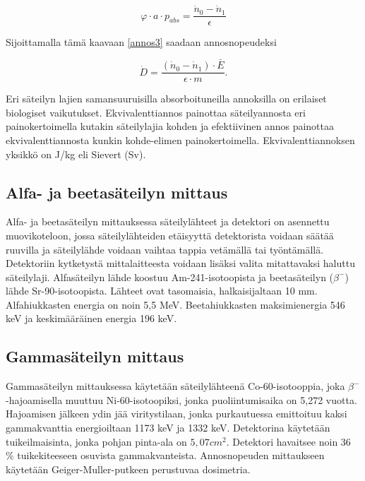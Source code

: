 \documentclass[a4paper,11pt]{article}
\begin{document}
\begin{equation}
  \varphi \cdot a \cdot p_{abs} = \frac{\dot{n}_0-\dot{n}_1}{\epsilon}
\end{equation}

Sijoittamalla tämä kaavaan \ref{annos3} saadaan annosnopeudeksi

\begin{equation}
  \dot{D} = \frac{(\dot{n}_0-\dot{n}_1) \cdot \bar{E}}{\epsilon \cdot m} .
\end{equation}

Eri säteilyn lajien samansuuruisilla absorboituneilla annoksilla on erilaiset biologiset vaikutukset. Ekvivalenttiannos painottaa säteilyannosta eri painokertoimella kutakin säteilylajia kohden ja efektiivinen annos painottaa ekvivalenttiannosta kunkin kohde-elimen painokertoimella. Ekvivalenttiannoksen yksikkö on J/kg eli Sievert (Sv).

\cite{ohje}

\subsection{Alfa- ja beetasäteilyn mittaus}
\label{laitteisto:alfabeeta}

Alfa- ja beetasäteilyn mittauksessa säteilylähteet ja detektori on asennettu muovikoteloon, jossa säteilylähteiden etäisyyttä detektorista voidaan säätää ruuvilla ja säteilylähde voidaan vaihtaa tappia vetämällä tai työntämällä. Detektoriin kytketystä mittalaitteesta voidaan lisäksi valita mitattavaksi haluttu säteilylaji. Alfasäteilyn lähde koostuu Am-241-isotoopista ja beetasäteilyn ($\beta^-$) lähde Sr-90-isotoopista. Lähteet ovat tasomaisia, halkaisijaltaan 10 mm. Alfahiukkasten energia on noin 5,5 MeV. Beetahiukkasten maksimienergia 546 keV ja keskimääräinen energia 196 keV. \cite{ohje}


\subsection{Gammasäteilyn mittaus}
\label{laitteisto:gamma}

Gammasäteilyn mittauksessa käytetään säteilylähteenä Co-60-isotooppia, joka $\beta^-$-hajoamisella muuttuu Ni-60-isotoopiksi, jonka puoliintumisaika on 5,272 vuotta. Hajoamisen jälkeen ydin jää viritystilaan, jonka purkautuessa emittoituu kaksi gammakvanttia energioiltaan 1173 keV ja 1332 keV. Detektorina käytetään tuikeilmaisinta, jonka pohjan pinta-ala on $5,07 cm^2$. Detektori havaitsee noin 36 \% tuikekiteeseen osuvista gammakvanteista. Annosnopeuden mittaukseen käytetään Geiger-Muller-putkeen perustuvaa dosimetria. \cite{ohje}
\end{document}
